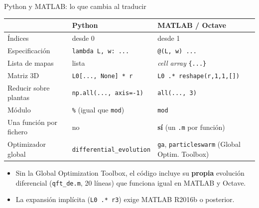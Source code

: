 \documentclass[aspectratio=169,11pt]{beamer}
\begin{document}
\begin{frame}{Python y MATLAB: lo que cambia al traducir}
  \footnotesize
  \begin{center}
  \begin{tabular}{l|l|l}
    & Python & MATLAB / Octave\\\hline
    Índices & desde 0 & desde 1\\
    Especificación & \texttt{lambda L, w: ...} & \texttt{@(L, w) ...}\\
    Lista de mapas & lista & \emph{cell array} \texttt{\{...\}}\\
    Matriz 3D & \texttt{L0[..., None] * r} & \texttt{L0 .* reshape(r,1,1,[])}\\
    Reducir sobre plantas & \texttt{np.all(..., axis=-1)} & \texttt{all(..., 3)}\\
    Módulo & \texttt{\%} (igual que \texttt{mod}) & \texttt{mod}\\
    Una función por fichero & no & \textbf{sí} (un \texttt{.m} por función)\\
    Optimizador global & \texttt{differential\_evolution} & \texttt{ga}, \texttt{particleswarm} (Global Optim. Toolbox)
  \end{tabular}
  \end{center}
  \begin{itemize}
    \item Sin la Global Optimization Toolbox, el código incluye su \textbf{propia} evolución diferencial (\texttt{qft\_de.m}, 20 líneas) que funciona igual en MATLAB y Octave.
    \item La expansión implícita (\texttt{L0 .* r3}) exige MATLAB R2016b o posterior.
  \end{itemize}
\end{frame}
\end{document}
